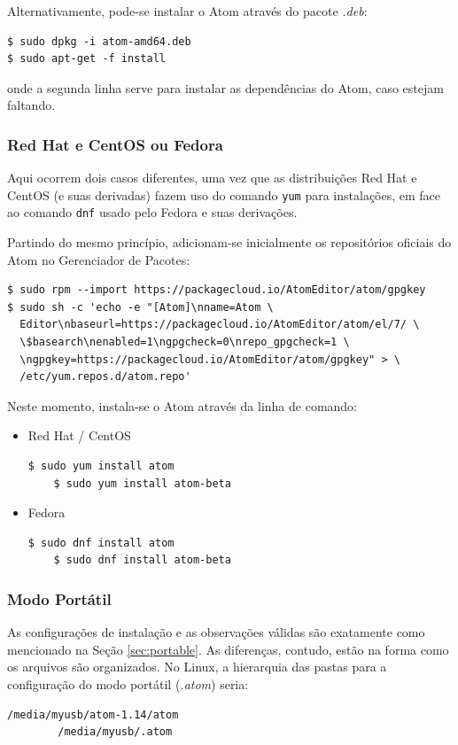 	Alternativamente, pode-se instalar o Atom através do pacote \textit{.deb}:
	\begin{Verbatim}[fontsize=\footnotesize]
$ sudo dpkg -i atom-amd64.deb
$ sudo apt-get -f install
	\end{Verbatim}
	onde a segunda linha serve para instalar as dependências do Atom, caso estejam faltando.

	\subsubsection{Red Hat e CentOS ou Fedora}
	Aqui ocorrem dois casos diferentes, uma vez que as distribuições Red Hat e CentOS (e suas derivadas) fazem uso do comando \verb|yum| para instalações, em face ao comando \verb|dnf| usado pelo Fedora e suas derivações.

	Partindo do mesmo princípio, adicionam-se inicialmente os repositórios oficiais do Atom no Gerenciador de Pacotes:
	\begin{Verbatim}[fontsize=\footnotesize]
$ sudo rpm --import https://packagecloud.io/AtomEditor/atom/gpgkey
$ sudo sh -c 'echo -e "[Atom]\nname=Atom \
  Editor\nbaseurl=https://packagecloud.io/AtomEditor/atom/el/7/ \
  \$basearch\nenabled=1\ngpgcheck=0\nrepo_gpgcheck=1 \
  \ngpgkey=https://packagecloud.io/AtomEditor/atom/gpgkey" > \
  /etc/yum.repos.d/atom.repo'
	\end{Verbatim}

	Neste momento, instala-se o Atom através da linha de comando:
	\begin{itemize}
		\item Red Hat / CentOS
		\begin{Verbatim}[fontsize=\footnotesize]
	$ sudo yum install atom
	$ sudo yum install atom-beta
		\end{Verbatim}
		\item Fedora
		\begin{Verbatim}[fontsize=\footnotesize]
	$ sudo dnf install atom
	$ sudo dnf install atom-beta
		\end{Verbatim}
	\end{itemize}

	\subsubsection{Modo Portátil}
	As configurações de instalação e as observações válidas são exatamente como mencionado na Seção \ref{sec:portable}. As diferenças, contudo, estão na forma como os arquivos são organizados. No Linux, a hierarquia das pastas para a configuração do modo portátil (\textit{.atom}) seria:
	\begin{Verbatim}[fontsize=\footnotesize]
		/media/myusb/atom-1.14/atom
		/media/myusb/.atom
	\end{Verbatim}

